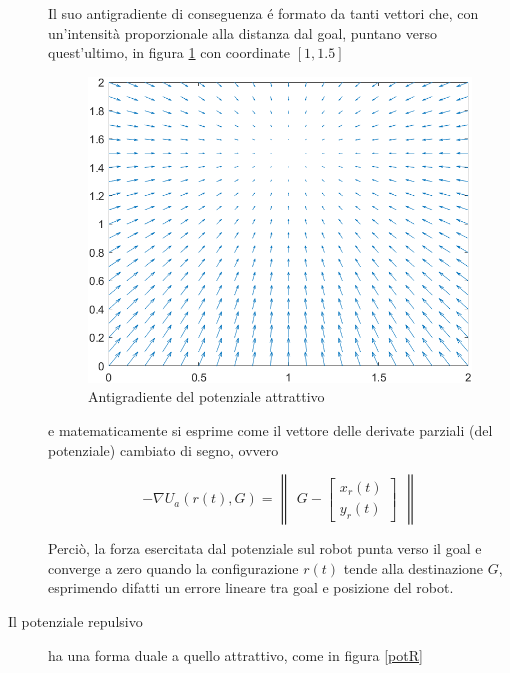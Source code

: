 \documentclass[14pt,twoside,a4paper]{extarticle}
\begin{document}
\begin{description}
Il suo antigradiente di conseguenza é formato da tanti vettori che, con un'intensità proporzionale alla distanza dal goal, puntano verso quest'ultimo, in figura \ref{antigradA} con coordinate \([1,1.5]\)
\begin{figure}[H]
\caption{Antigradiente del potenziale attrattivo}
\label{antigradA}
\includegraphics[width=\textwidth]{antigradA.png}
\end{figure} e matematicamente si esprime come il vettore delle derivate parziali (del potenziale) cambiato di segno, ovvero 

\begin{equation}
-\nabla U_a(r(t),G) = \begin{Vmatrix}G - \begin{bmatrix} x_r(t)\\ y_r(t) \end{bmatrix}\end{Vmatrix}
\end{equation}

Perciò, la forza esercitata dal potenziale sul robot punta verso il goal e converge a zero quando la configurazione \(r(t)\) tende alla destinazione \(G\), esprimendo difatti un errore lineare tra goal e posizione del robot. 

\item[Il potenziale repulsivo] ha una forma duale a quello attrattivo, come in figura \ref{potR}


\end{description}
\end{document}
